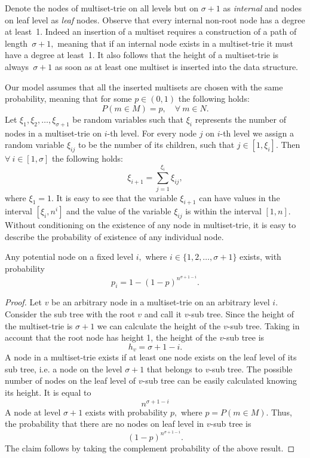 Denote the nodes of multiset-trie on all levels but on $\sigma + 1$ as \emph{internal}
and nodes on leaf level as \emph{leaf} nodes.
%
Observe that every internal non-root node has a degree at least~1. Indeed an
insertion of a multiset requires a construction of a path of length~$\sigma + 1,$
meaning that if an internal node exists in a multiset-trie it must have a degree
at least~1. It also follows that the height of a multiset-trie is always~$\sigma +1$
as soon as at least one multiset is inserted into the data structure.

Our model assumes that all the inserted multisets are chosen with the same probability,
meaning that for some $p\in (0,1)$ the following holds:
\[
P(m\in M) = p, \quad \forall~m\in N.
\]
%
Let $\xi_1, \xi_2, \ldots, \xi_{\sigma+1}$ be random variables such that $\xi_i$
represents the number of nodes in a multiset-trie on $i$-th level. For every node $j$ 
on $i$-th level we assign a random variable $\xi_{ij}$ to be the number of its children, 
such that $j\in[1,\xi_i].$ Then $\forall~i\in[1,\sigma]$ the following holds:
%
\begin{equation}\label{eq:sum_recursive}
\xi_{i+1} = \sum_{j=1}^{\xi_i} \xi_{ij},
\end{equation}
%
where $\xi_1 = 1.$
%
It is easy to see that the variable $\xi_{i+1}$ can have values in the interval
$[\xi_i,n^{i}]$ and the value of the variable $\xi_{ij}$ is within the interval $[1,n].$
Without conditioning on the existence of any node in multiset-trie, 
it is easy to describe the probability of existence of any individual node.

\begin{lemma}\label{l:prob-node-existence}


Any potential node on a fixed level $i,$ where $i\in \{ 1,2,\ldots, \sigma +1 \}$ exists, %
with probability
\begin{equation}
p_i=1-(1-p)^{n^{\sigma + 1 -i}}.
\end{equation}
\end{lemma}
\begin{proof}
Let $v$ be an arbitrary node in a multiset-trie on an arbitrary level $i.$ Consider
the sub tree with the root $v$ and call it $v$-sub tree. Since the height of the
multiset-trie is $\sigma + 1$ we can calculate the height of the $v$-sub tree.
Taking in account that the root node has height 1, the height of the $v$-sub tree is
%
\[
h_v = \sigma + 1 - i.
\]
%
A node in a multiset-trie exists if at least one node exists on the leaf level of its
sub tree, i.e. a node on the level $\sigma + 1$ that belongs to $v$-sub tree. The possible
number of nodes on the leaf level of $v$-sub tree can be easily calculated knowing its height.
It is equal to
%
\[
n^{\sigma + 1 - i}
\]
%
A node at level $\sigma+1$ exists with probability $p,$ where $p = P(m\in M).$
Thus, the probability that there are no nodes on leaf level in $v$-sub tree is
%
\[
(1-p)^{n^{\sigma +1 - i}}.
\]
%
The claim follows by taking the complement probability of the above result.
%
\end{proof}

